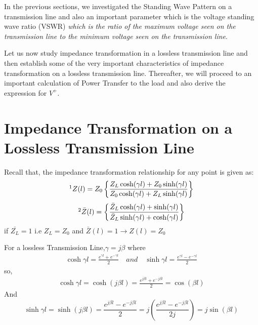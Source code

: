 In the previous sections, we investigated the Standing Wave Pattern on a transmission line and also an important parameter which is the voltage standing wave ratio (VSWR) \emph{which is the ratio of the maximum voltage seen on the transmission line to the minimum voltage seen on the transmission line}.

Let us now study impedance transformation in a lossless
transmission line and then establish some of the very important characteristics of impedance transformation on a lossless transmission line. Thereafter, we will proceed to an important calculation of Power Transfer to the load and also derive the expression for $V^{+}$.

\section{Impedance Transformation on a Lossless Transmission Line}\label{lec:lec6}
Recall that, the impedance transformation relationship for any point is given as:
\begin{align*}
\footnotemark[1]Z(l) = Z_0\left\lbrace \frac{Z_L\cosh(\gamma l) + Z_0\sinh(\gamma l)}{Z_0\cosh(\gamma l) + Z_L\sinh(\gamma l)}\right\rbrace 
\end{align*}
\begin{align*}
\footnotemark[2]\bar{Z}(l) = \left\lbrace \frac{\bar{Z}_L\cosh(\gamma l) + \sinh(\gamma l)}{\bar{Z}_L\sinh(\gamma l) + \cosh(\gamma l)}\right\rbrace 
\end{align*}
if $\bar{Z_L} = 1$ i.e $Z_L = Z_0$ and $\bar{Z}(l) = 1 \rightarrow  Z(l) = Z_0$

For a lossless Transmission Line,$\gamma=j\beta$ where
\begin{align*}
\cosh\gamma l = \frac{e^{\gamma l} + e^{-\gamma l}}{2} \quad and \quad \sinh\gamma l = \frac{e^{\gamma l} - e^{-\gamma l}}{2}
\end{align*}
so,
\begin{align*}
\cosh\gamma l= \cosh(j\beta l)=\frac{e^{j \beta l} + e^{-j \beta l}}{2}=\cos(\beta l)
\end{align*}
And
\begin{dmath*}
\sinh\gamma l=\sinh(j\beta l) = \frac{e^{j \beta l}-e^{-j\beta l}}{2} = j\left( \frac{e^{j\beta l}-e^{-j\beta l}}{2j}\right) =j\sin(\beta l)
\end{dmath*}

